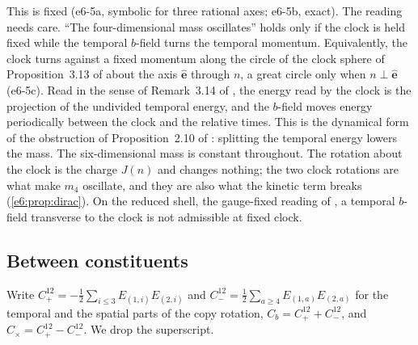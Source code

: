 This is fixed (e6-5a, symbolic for three rational axes; e6-5b, exact). The reading needs care. ``The four-dimensional mass oscillates'' holds only
if the clock is held fixed while the temporal $b$-field turns the temporal momentum. Equivalently, the clock turns against a fixed momentum along the
circle of the clock sphere of Proposition~3.13 of \cite{TR} about the axis $\hat{\mathbf e}$ through $n$, a great circle only when $n\perp\hat{\mathbf e}$ (e6-5c). Read in the sense of Remark~3.14 of \cite{TR}, the energy read by the clock is
the projection of the undivided temporal energy, and the $b$-field moves energy periodically between the clock and the relative times. This is the
dynamical form of the obstruction of Proposition~2.10 of \cite{RE}: splitting the temporal energy lowers the mass. The six-dimensional mass is
constant throughout. The rotation about the clock is the charge $J(n)$ and changes nothing; the two clock rotations are what make $m_4$ oscillate, and
they are also what the kinetic term breaks (\cref{e6:prop:dirac}). On the reduced shell, the gauge-fixed reading of \cite{ES17}, a temporal $b$-field
transverse to the clock is not admissible at fixed clock.

\subsection{Between constituents}
\label{e6:sec:copies}

Write $C^{12}_+=-\tfrac12\sum_{i\le3}E_{(1,i)}E_{(2,i)}$ and $C^{12}_-=\tfrac12\sum_{a\ge4}E_{(1,a)}E_{(2,a)}$ for the temporal and the spatial parts of the copy rotation,
$C_b=C^{12}_++C^{12}_-$, and $C_\times=C^{12}_+-C^{12}_-$. We drop the superscript.

